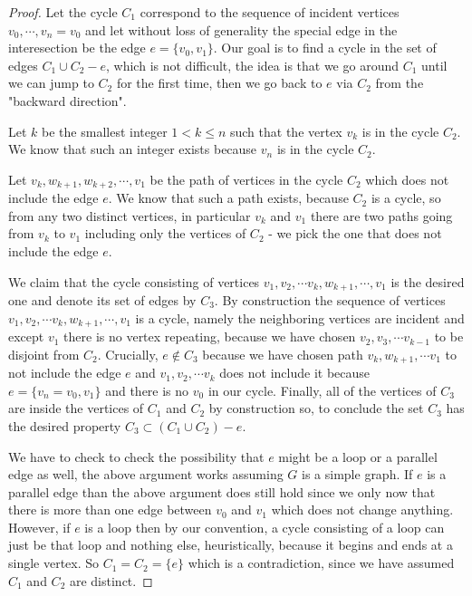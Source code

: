 \begin{proof}

Let the cycle $C_1$ correspond to the sequence of incident vertices  $v_0, \cdots, v_n = v_0$ and let without loss of generality the special edge in the interesection be the edge $e = \{v_0, v_1\}$. Our goal is to find a cycle in the set of edges $C_1 \cup C_2 -e$, which is not difficult, the idea is that we go around $C_1$ until we can jump to $C_2$ for the first time, then we go back to $e$ via $C_2$ from the "backward direction".

Let $k$ be the smallest integer $1<k\leq n$ such that the vertex $v_k$ is in the cycle $C_2$. We know that such an integer exists because $v_n$ is in the cycle $C_2$. 

Let $v_k, w_{k+1}, w_{k+2}, \cdots, v_1$ be the path of vertices in the cycle $C_2$ which does not include the edge $e$. We know that such a path exists, because $C_2$ is a cycle, so from any two distinct vertices, in particular $v_k$ and $v_1$ there are two paths going from $v_k$ to $v_1$ including only the vertices of $C_2$ - we pick the one that does not include the edge $e$.

We claim that the cycle consisting of vertices $v_1, v_2, \cdots v_k, w_{k+1}, \cdots , v_1$ is the desired one and denote its set of edges by $C_3$. By construction the sequence of vertices $v_1, v_2, \cdots v_k, w_{k+1}, \cdots , v_1$ is a cycle, namely the neighboring vertices are incident and except $v_1$ there is no vertex repeating, because we have chosen $v_2, v_3, \cdots v_{k-1}$ to be disjoint from $C_2$. Crucially, $e \notin C_3$ because we have chosen path $v_k, w_{k+1}, \cdots v_1$ to not include the edge $e$ and $v_1, v_2, \cdots v_k$ does not include it because $e = \{v_n = v_0, v_1\}$ and there is no $v_0$ in our cycle. Finally, all of the vertices of $C_3$ are inside the vertices of $C_1$ and $C_2$ by construction so, to conclude the set $C_3$ has the desired property $C_3 \subset (C_1 \cup C_2) - e$.

We have to check to check the possibility that $e$ might be a loop or a parallel edge as well, the above argument works assuming $G$ is a simple graph. If $e$ is a parallel edge than the above argument does still hold since we only now that there is more than one edge between $v_0$
and $v_1$ which does not change anything. However, if $e$ is a loop then by our convention, a cycle consisting of a loop can just be that loop and nothing else, heuristically, because it begins and ends at a single vertex. So $C_1 = C_2 = \{e\}$ which is a contradiction, since we have assumed $C_1$ and $C_2$ are distinct.


\end{proof}
